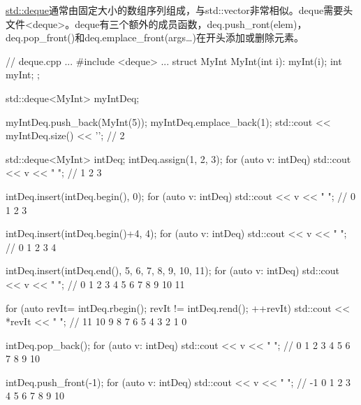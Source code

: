 

\href{http://en.cppreference.com/w/cpp/container/deque}{std::deque}通常由固定大小的数组序列组成，与std::vector非常相似。deque需要头文件<deque>。deque有三个额外的成员函数，deq.push\_ront(elem)，deq.pop\_front()和deq.emplace\_front(args…)在开头添加或删除元素。


\begin{cpp}
// deque.cpp
...
#include <deque>
...
struct MyInt{
	MyInt(int i): myInt(i){};
	int myInt;
};

std::deque<MyInt> myIntDeq;

myIntDeq.push_back(MyInt(5));
myIntDeq.emplace_back(1);
std::cout << myIntDeq.size() << '\n'; // 2

std::deque<MyInt> intDeq;
intDeq.assign({1, 2, 3});
for (auto v: intDeq) std::cout << v << " "; // 1 2 3

intDeq.insert(intDeq.begin(), 0);
for (auto v: intDeq) std::cout << v << " "; // 0 1 2 3

intDeq.insert(intDeq.begin()+4, 4);
for (auto v: intDeq) std::cout << v << " "; // 0 1 2 3 4

intDeq.insert(intDeq.end(), {5, 6, 7, 8, 9, 10, 11});
for (auto v: intDeq) std::cout << v << " "; // 0 1 2 3 4 5 6 7 8 9 10 11

for (auto revIt= intDeq.rbegin(); revIt != intDeq.rend(); ++revIt)
	std::cout << *revIt << " "; // 11 10 9 8 7 6 5 4 3 2 1 0

intDeq.pop_back();
for (auto v: intDeq) std::cout << v << " "; // 0 1 2 3 4 5 6 7 8 9 10

intDeq.push_front(-1);
for (auto v: intDeq) std::cout << v << " "; // -1 0 1 2 3 4 5 6 7 8 9 10
\end{cpp}











































